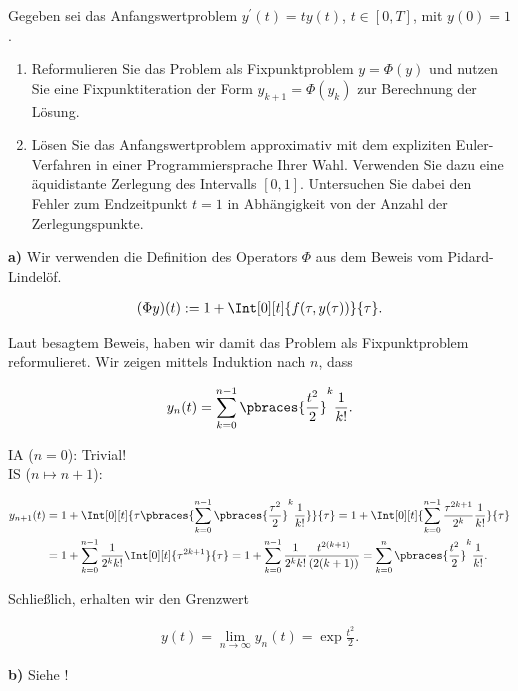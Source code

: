 \begin{exercise}

Gegeben sei das Anfangswertproblem $y^\prime(t) = t y(t)$, $t \in [0, T]$, mit $y(0) = 1$.

\begin{enumerate}[label = \textbf{\alph*)}]

  \item
  Reformulieren Sie das Problem als Fixpunktproblem $y = \Phi(y)$ und nutzen Sie eine Fixpunktiteration der Form $y_{k+1} = \Phi(y_k)$ zur Berechnung der Lösung.

  \item
  Lösen Sie das Anfangswertproblem approximativ mit dem expliziten Euler-Verfahren in einer
  Programmiersprache Ihrer Wahl.
  Verwenden Sie dazu eine äquidistante Zerlegung des Intervalls $[0, 1]$.
  Untersuchen Sie dabei den Fehler zum Endzeitpunkt $t = 1$ in Abhängigkeit von der Anzahl der Zerlegungspunkte.

\end{enumerate}

\end{exercise}

\begin{solution}

\textbf{a)}
Wir verwenden die Definition des Operators $\Phi$ aus dem Beweis vom Pidard-Lindelöf.

\begin{align*}
  (\Phi y)(t)
  :=
  1 + \Int[0][t]{f(\tau, y(\tau))}{\tau}.
\end{align*}

Laut besagtem Beweis, haben wir damit das Problem als Fixpunktproblem reformulieret.
Wir zeigen mittels Induktion nach $n$, dass

\begin{align*}
  y_n(t)
  =
  \sum_{k=0}^{n-1} \pbraces{\frac{t^2}{2}}^k \frac{1}{k!}.
\end{align*}

IA ($n = 0$):
Trivial! \\

IS ($n \mapsto n+1$):

\begin{align*}
  y_{n+1}(t)
  & =
  1 + \Int[0][t]
  {
    \tau \pbraces
    {
      \sum_{k=0}^{n-1}
      \pbraces{\frac{\tau^2}{2}}^k
      \frac{1}{k!}
    }
  }
  {\tau}
  =
  1 + \Int[0][t]
  {
    \sum_{k=0}^{n-1}
    \frac
    {\tau^{2k + 1}}
    {2^k}
    \frac{1}{k!}
  }
  {\tau} \\
  & =
  1 +
  \sum_{k=0}^{n-1}
  \frac{1}{2^k k!}
  \Int[0][t]{\tau^{2k + 1}}{\tau}
  = 1 +
  \sum_{k=0}^{n-1}
  \frac{1}{2^k k!}
  \frac{t^{2(k+1)}}{(2(k+1))}
  =
  \sum_{k=0}^n \pbraces{\frac{t^2}{2}}^k \frac{1}{k!}.
\end{align*}

Schließlich, erhalten wir den Grenzwert

\begin{align*}
  y(t)
  =
  \lim_{n \to \infty} y_n(t)
  =
  \exp{\frac{t^2}{2}}.
\end{align*}

\textbf{b)}
Siehe !

\end{solution}
